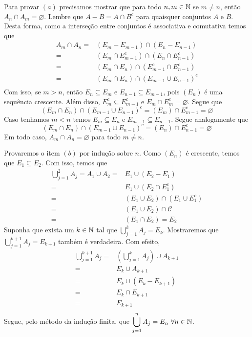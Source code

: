 \begin{prova}
    Para provar $(a)$ precisamos mostrar que para todo $n,m \in \operatorname{\mathbb{N}}$ se $m \neq n$, então $A_n \cap A_m = \varnothing$.
    Lembre que $A - B = A\cap B^c$ para quaisquer conjuntos $A$ e $B$.
    Desta forma, como a interseção entre conjuntos é associativa e comutativa temos que
    \begin{align*}
        A_m\cap A_n =& (E_m - E_{m -1}) \cap (E_n - E_{n -1})\\
        =& (E_m \cap E_{m -1}^c) \cap (E_n \cap E_{n -1}^c)\\
        =& (E_m \cap E_n) \cap ( E_{m -1}^c\cap E_{n -1}^c)\\
        =& (E_m \cap E_n) \cap \left( E_{m -1}\cup E_{n -1}\right)^c\\
    \end{align*}
    Com isso, se $m > n$, então $E_n \subseteq E_m$ e $E_{n-1} \subseteq E_{m-1}$, pois $(E_n)$ é uma sequência crescente.
    Além disso, $E_m^c \subseteq E_{m -1}^c$ e $E_m \cap E_m^c = \varnothing$.
    Segue que
    $$
    (E_m \cap E_n) \cap \left( E_{m -1}\cup E_{n -1}\right)^c =
    (E_m) \cap E_{m -1}^c = 
    \varnothing
    $$
    Caso tenhamos $m < n$ temos $E_m \subseteq E_n$ e $E_{m-1} \subseteq E_{n-1}$.
    Segue analogamente que 
    $$
    (E_m \cap E_n) \cap \left( E_{m -1}\cup E_{n -1}\right)^c =
    (E_n) \cap E_{n -1}^c = 
    \varnothing
    $$
    Em todo caso, $A_m \cap A_n = \varnothing$ para todo $m \neq n$.

    Provaremos o item $(b)$ por indução sobre $n$.
    Como $(E_n)$ é crescente, temos que $E_1 \subseteq E_2$.
    Com isso, temos que 
        \begin{align*}
            \bigcup_{j = 1}^2 A_j = A_1 \cup A_2= & E_1 \cup (E_2 - E_1)\\
            = & E_1 \cup (E_2 \cap E_1^c)\\
            = & (E_1 \cup E_2) \cap (E_1 \cup E_1^c)\\
            = & (E_1 \cup E_2) \cap \mathcal{C}\\
            = & (E_1 \cap E_2)
            = E_2  
        \end{align*}
    Suponha que exista um $k \in \operatorname{\mathbb{N}}$ tal que $\displaystyle \bigcup_{j = 1}^k A_j = E_k$.
    Mostraremos que $\displaystyle \bigcup_{j = 1}^{k+1} A_j = E_{k +1}$ também é verdadeira.
    Com efeito, 
    \begin{align*}
        \bigcup_{j = 1}^{k+1} A_j =& \left(\bigcup_{j = 1}^{k} A_j\right) \cup A_{k+1}\\
        =& E_k \cup A_{k +1}\\
        =& E_k \cup (E_k - E_{k+1})\\
        =& E_k \cap E_{k+1}\\
        =& E_{k+1}\\
    \end{align*}
    Segue, pelo método da indução finita, que $\displaystyle \bigcup_{j = 1}^n A_j = E_n\ \forall n \in \operatorname{\mathbb{N}}$.


\end{prova}
